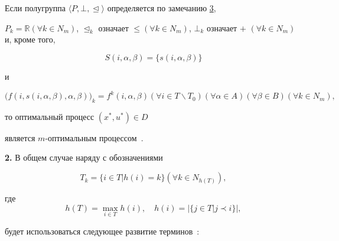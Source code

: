 \begin{remark}[4] Если полугруппа $\langle P,\bot, \trianglelefteq

\rangle $ определяется по замечанию \hyperlink{ovch:zam3}{3}, 

$P_k =\mathbb{R}(\forall k\in N_m )$, $\trianglelefteq_k $ означает $\le (\forall k\in N_m )$, $\bot

_k $ означает $+$ $(\forall k\in N_m )$ и, кроме того, 

$$S(i,\alpha,\beta )=\{s(i,\alpha,\beta)\}$$

и 

$$\big(f(i,s(i,\alpha,\beta),\alpha,\beta)\big)_k=f^k(i,\alpha,\beta) (\forall i\in T\backslash

T_0)  (\forall \alpha \in A)(\forall \beta \in B)(\forall k\in N_m ),$$

то оптимальный процесс $(x^\ast,u^\ast)\in D$

является $m$-оптимальным процессом~\cite{ovchinnikov:bib2}.

\end{remark}



\smallskip



{\bf 2.} В общем случае наряду с обозначениями~\cite{ovchinnikov:bib2} 

$$T_k =\{i\in T\vert

h(i)=k\}(\forall k\in N_{h(T)}),$$ 

где $$h(T)=\max \limits_{i\in T} h(i),\quad h(i)=\vert \{j\in T\vert j\prec i\}\vert,$$

будет использоваться следующее развитие терминов~\cite{ovchinnikov:bib2}: 




